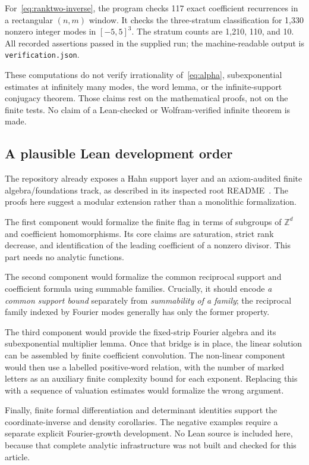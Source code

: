 \documentclass[11pt,letterpaper]{article}
\theoremstyle{definition}
\theoremstyle{remark}
\newcommand{\Z}{\mathbb Z}
\numberwithin{equation}{section}
\begin{document}
For~\eqref{eq:ranktwo-inverse}, the program checks 117 exact coefficient
recurrences in a rectangular $(n,m)$ window.  It checks the three-stratum
classification for 1,330 nonzero integer modes in $[-5,5]^3$.  The stratum
counts are 1,210, 110, and 10.  All recorded assertions passed in the supplied
run; the machine-readable output is \texttt{verification.json}.

These computations do not verify irrationality of~\eqref{eq:alpha},
subexponential estimates at infinitely many modes, the word lemma, or the
infinite-support conjugacy theorem.  Those claims rest on the mathematical
proofs, not on the finite tests.  No claim of a Lean-checked or
Wolfram-verified infinite theorem is made.

\subsection{A plausible Lean development order}

The repository already exposes a Hahn support layer and an axiom-audited
finite algebra/foundations track, as described in its inspected root
README~\cite{repo}.  The proofs here suggest a modular extension rather
than a monolithic formalization.

The first component would formalize the finite flag in terms of subgroups
of $\Z^d$ and coefficient homomorphisms.  Its core claims are saturation,
strict rank decrease, and identification of the leading coefficient of a
nonzero divisor.  This part needs no analytic functions.

The second component would formalize the common reciprocal support and
coefficient formula using summable families.  Crucially, it should encode
\emph{a common support bound} separately from \emph{summability of a family};
the reciprocal family indexed by Fourier modes generally has only the
former property.

The third component would provide the fixed-strip Fourier algebra and its
subexponential multiplier lemma.  Once that bridge is in place, the linear
solution can be assembled by finite coefficient convolution.  The
non-linear component would then use a labelled positive-word relation,
with the number of marked letters as an auxiliary finite complexity bound
for each exponent.  Replacing this with a sequence of valuation estimates
would formalize the wrong argument.

Finally, finite formal differentiation and determinant identities support
the coordinate-inverse and density corollaries.  The negative examples
require a separate explicit Fourier-growth development.  No Lean source is
included here, because that complete analytic infrastructure was not built
and checked for this article.
\end{document}
